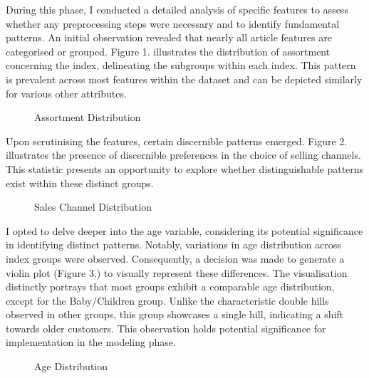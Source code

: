 \documentclass[conference,compsoc]{IEEEtran}
\begin{document}
During this phase, I conducted a detailed analysis of specific features to assess whether any preprocessing steps were necessary and to identify fundamental patterns. An initial observation revealed that nearly all article features are categorised or grouped. Figure 1. illustrates the distribution of assortment concerning the index, delineating the subgroups within each index. This pattern is prevalent across most features within the dataset and can be depicted similarly for various other attributes.

\begin{figure}[htbp]
    \centering
    \caption{Assortment Distribution}
    \label{fig:example}
\end{figure}

Upon scrutinising the features, certain discernible patterns emerged. Figure 2. illustrates the presence of discernible preferences in the choice of selling channels. This statistic presents an opportunity to explore whether distinguishable patterns exist within these distinct groups.

\begin{figure}[htbp]
    \centering
    \caption{Sales Channel Distribution}
    \label{fig:example}
\end{figure}

I opted to delve deeper into the age variable, considering its potential significance in identifying distinct patterns. Notably, variations in age distribution across index groups were observed. Consequently, a decision was made to generate a violin plot (Figure 3.) to visually represent these differences. The visualisation distinctly portrays that most groups exhibit a comparable age distribution, except for the Baby/Children group. Unlike the characteristic double hills observed in other groups, this group showcases a single hill, indicating a shift towards older customers. This observation holds potential significance for implementation in the modeling phase.

\begin{figure}[htbp]
    \centering
    \caption{Age Distribution}
    \label{fig:example}
\end{figure}
\end{document}
